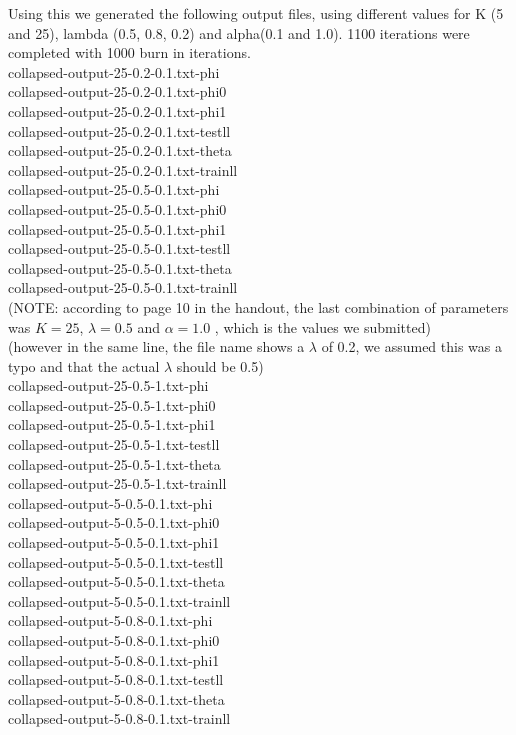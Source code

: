 \documentclass{article}
\begin{document}
Using this we generated the following output files, using different values for K (5 and 25), lambda (0.5, 0.8, 0.2)
and alpha(0.1 and 1.0). 1100 iterations were completed with 1000 burn in iterations.\\
collapsed-output-25-0.2-0.1.txt-phi\\
collapsed-output-25-0.2-0.1.txt-phi0\\
collapsed-output-25-0.2-0.1.txt-phi1\\
collapsed-output-25-0.2-0.1.txt-testll\\
collapsed-output-25-0.2-0.1.txt-theta\\
collapsed-output-25-0.2-0.1.txt-trainll\\
collapsed-output-25-0.5-0.1.txt-phi\\
collapsed-output-25-0.5-0.1.txt-phi0\\
collapsed-output-25-0.5-0.1.txt-phi1\\
collapsed-output-25-0.5-0.1.txt-testll\\
collapsed-output-25-0.5-0.1.txt-theta\\
collapsed-output-25-0.5-0.1.txt-trainll\\
(NOTE: according to page 10 in the handout, the last combination of parameters was $K=25$, $\lambda=0.5$ and $\alpha=1.0$ , which is the values we submitted)\\
(however in the same line, the file name shows a $\lambda$ of 0.2, we assumed this was a typo and that the actual $\lambda$ should be 0.5)\\
collapsed-output-25-0.5-1.txt-phi\\
collapsed-output-25-0.5-1.txt-phi0\\
collapsed-output-25-0.5-1.txt-phi1\\
collapsed-output-25-0.5-1.txt-testll\\
collapsed-output-25-0.5-1.txt-theta\\
collapsed-output-25-0.5-1.txt-trainll\\
collapsed-output-5-0.5-0.1.txt-phi\\
collapsed-output-5-0.5-0.1.txt-phi0\\
collapsed-output-5-0.5-0.1.txt-phi1\\
collapsed-output-5-0.5-0.1.txt-testll\\
collapsed-output-5-0.5-0.1.txt-theta\\
collapsed-output-5-0.5-0.1.txt-trainll\\
collapsed-output-5-0.8-0.1.txt-phi\\
collapsed-output-5-0.8-0.1.txt-phi0\\
collapsed-output-5-0.8-0.1.txt-phi1\\
collapsed-output-5-0.8-0.1.txt-testll\\
collapsed-output-5-0.8-0.1.txt-theta\\
collapsed-output-5-0.8-0.1.txt-trainll\\
\end{document}
